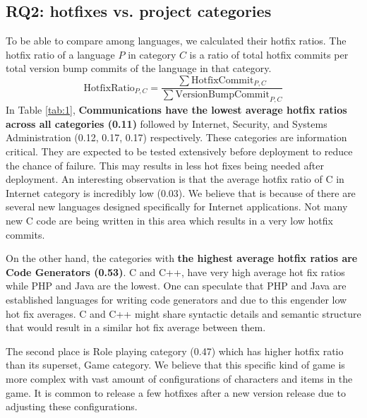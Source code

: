 \documentclass{sig-alternate}
\begin{document}
\subsection{RQ2: hotfixes vs. project categories}
To be able to compare among languages, we calculated their hotfix ratios. The hotfix ratio of a language $P$ in category $C$ is a ratio of total hotfix commits per total version bump commits of the language in that category. %
\begin{equation*}
\mathrm{HotfixRatio}_{P,C} = \frac{\sum{\mathrm{HotfixCommit}_{P,C}}}{\sum{\mathrm{VersionBumpCommit}_{P,C}}}
\end{equation*}
In Table \ref{tab:1}, \textbf{Communications have the lowest average hotfix ratios across all categories (0.11)} followed by Internet, Security, and Systems Administration (0.12, 0.17, 0.17) respectively. These categories are information critical. They are expected to be tested extensively before deployment to reduce the chance of failure. This may results in less hot fixes being needed after deployment. An interesting observation is that the average hotfix ratio of C in Internet category is incredibly low (0.03). We believe that is because of there are several new languages designed specifically for Internet applications. Not many new C code are being written in this area which results in a very low hotfix commits. %

On the other hand, the categories with \textbf{the highest average hotfix ratios are Code Generators (0.53)}. C and C++, have very high average hot fix ratios while  PHP and Java are the lowest. One can speculate that PHP and Java are established languages for writing code generators and due to this engender low hot fix averages. C and C++ might share syntactic details and semantic structure that would result in a similar hot fix average between them. 

The second place is Role playing category (0.47) which has higher hotfix ratio than its superset, Game category. We believe that this specific kind of game is more complex with vast amount of configurations of characters and items in the game. It is common to release a few hotfixes after a new version release due to adjusting these configurations. %
\end{document}
